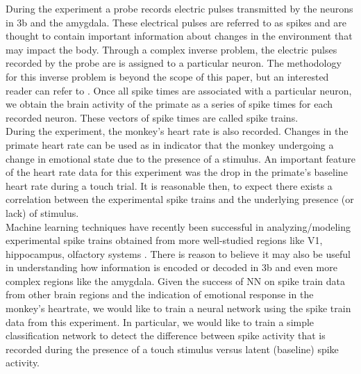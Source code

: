 \documentclass[12pt]{article}
\begin{document}
\indent During the experiment a probe records electric pulses transmitted by the neurons in 3b and the amygdala. These electrical pulses are referred to as spikes and are thought to contain important information about changes in the environment that may impact the body.  Through a complex inverse problem, the electric pulses recorded by the probe are is assigned to a particular neuron. The methodology for this inverse problem is beyond the scope of this paper,
but an interested reader can refer to \cite{spike,greene}. Once all spike
times are associated with a particular neuron, we obtain the brain activity of the primate
as a series of spike times for each recorded neuron. These vectors of spike times are called spike trains.  \\
\indent During the experiment, the monkey's heart rate is also recorded. Changes in the primate heart rate can be used as in indicator that the monkey undergoing a change in emotional state due to the presence of a stimulus. An important feature of the heart rate data for this experiment was the drop in the primate's baseline heart rate during a touch trial. It is reasonable then, to expect there exists a correlation between the experimental spike trains and the underlying presence (or lack) of stimulus.\\
\indent  Machine learning techniques have recently been successful in analyzing/modeling experimental spike trains obtained from more well-studied regions like V1, hippocampus, olfactory systems \cite{laza,banino,stevens}. There is reason to believe it may also be useful in understanding how information is encoded or decoded in 3b and even more complex regions like the amygdala. Given the success of NN on spike train data from other brain regions and the indication of emotional response in the monkey's heartrate, we would like to train a neural network using the spike train data from this experiment.  In particular, we would like to train a simple classification network to detect the difference between spike activity that is recorded during the presence of a touch stimulus versus latent (baseline) spike activity. \\
\end{document}
